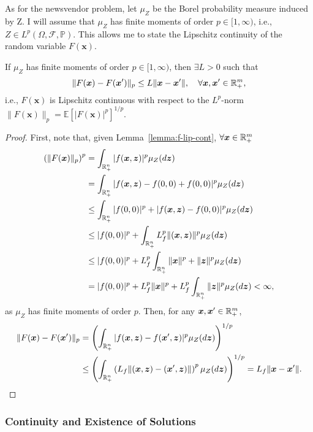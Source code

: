 \documentclass[12pt]{article}
\begin{document}
As for the newsvendor problem, let $\mu_Z$ be the Borel probability measure induced by Z.
I will assume that $\mu_Z$ has finite moments of order $p\in [1,\infty)$, i.e., $Z \in L^{p}(\Omega,\mathcal{F},\mathbb{P})$.
This allows me to state the Lipschitz continuity of the random variable $F(\bm{x})$.
\begin{lemma}[\citet{burtscheidtBilevelLinearOptimization2020}, Lemma~17.2.4\footnote{Except the case for probability measures with finite moments of order $p=\infty$.}]\label{lemma:F-lip-cont}
    If $\mu_Z$ has finite moments of order $p\in [1,\infty)$, then $\exists L>0$ such that \[
	\|F(\bm{x}) - F(\bm{x}')\|_p \le L \|\bm{x} - \bm{x}'\|,\quad \forall \bm{x},\bm{x}' \in \mathbb{R}^{m}_{+}
    ,\] i.e., $F(\bm{x})$ is Lipschitz continuous with respect to the $L^p$-norm $\|F(\bm{x})\|_p = \mathbb{E}[|F(\bm{x})|^{p}]^{1 / p}$.
\end{lemma}
\begin{proof}
    First, note that, given Lemma~\ref{lemma:f-lip-cont}, $\forall \bm{x} \in \mathbb{R}^{m}_{+}$
    \begin{align*}
	\left( \|F(\bm{x})\|_p \right)^{p} &= \int_{\mathbb{R}^{n}_{+}} |f(\bm{x},\bm{z})|^{p} \mu_Z(d\bm{z})  \\
	&= \int_{\mathbb{R}^{n}_{+}} |f(\bm{x},\bm{z}) - f(0,0) + f(0,0)|^{p} \mu_Z(d\bm{z})  \\
	&\le  \int_{\mathbb{R}^{n}_{+}} |f(0,0)|^{p} + |f(\bm{x},\bm{z}) - f(0,0)|^{p} \mu_Z(d\bm{z})  \\
	&\le |f(0,0)|^{p} + \int_{\mathbb{R}^{n}_{+}} L_f^{p} \|(\bm{x},\bm{z})\|^{p} \mu_Z(d\bm{z}) \\
	&\le |f(0,0)|^{p} + L_f^{p} \int_{\mathbb{R}^{n}_{+}} \|\bm{x}\|^{p} + \|\bm{z}\|^{p} \mu_Z(d\bm{z}) \\
	&= |f(0,0)|^{p} + L_f^{p} \|\bm{x}\|^{p} + L_f^{p} \int_{\mathbb{R}^{n}_{+}}\|\bm{z}\|^{p} \mu_Z(d\bm{z}) < \infty
    ,\end{align*}
    as $\mu_Z$ has finite moments of order $p$.
    Then, for any $\bm{x},\bm{x}' \in \mathbb{R}^{m}_{+}$,
    \begin{align*}
        \|F(\bm{x}) - F(\bm{x}')\|_{p} &= \left( \int_{\mathbb{R}^{n}_{+}} |f(\bm{x},\bm{z}) - f(\bm{x}',\bm{z})|^{p}\mu_Z(d\bm{z}) \right)^{1 / p} \\ 
	&\le \left( \int_{\mathbb{R}^{n}_{+}} \left( L_f \|(\bm{x},\bm{z}) - (\bm{x}',\bm{z})\| \right)^{p}\mu_Z(d\bm{z}) \right)^{1 / p} =  L_f \|\bm{x}-\bm{x}'\|
    .\end{align*}
\end{proof}

\subsubsection*{Continuity and Existence of Solutions}
\end{document}
